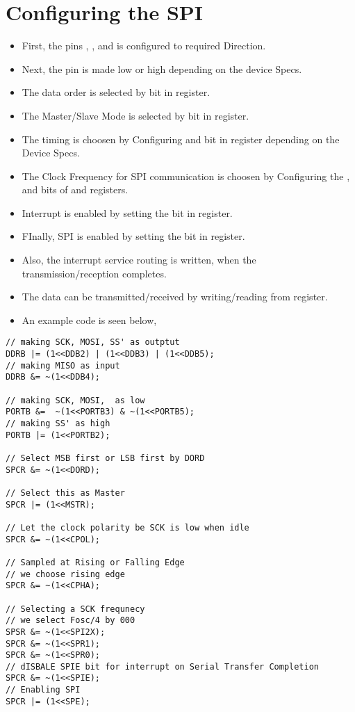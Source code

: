 \section{Configuring the SPI}
\begin{itemize}
    \item First, the pins , ,  and  is configured to required Direction.
    \item Next, the   pin is made low or high depending on the device Specs.
    \item The data order is selected by  bit in  register.
    \item The Master/Slave Mode is selected by  bit in  register.
    \item The timing is choosen by Configuring  and  bit in  register depending on the Device Specs.
    \item The Clock Frequency for SPI communication is choosen by Configuring the ,  and  bits of  and  registers.
    \item Interrupt is enabled by setting the  bit in  register.
    \item FInally, SPI is enabled by setting the  bit in  register.
    \item Also, the interrupt service routing is written, when the transmission/reception completes.
    \item The data can be transmitted/received by writing/reading from  register.
    \item An example code is seen below,
\end{itemize}

\begin{verbatim}
// making SCK, MOSI, SS' as outptut
DDRB |= (1<<DDB2) | (1<<DDB3) | (1<<DDB5);
// making MISO as input
DDRB &= ~(1<<DDB4);

// making SCK, MOSI,  as low
PORTB &=  ~(1<<PORTB3) & ~(1<<PORTB5);
// making SS' as high
PORTB |= (1<<PORTB2);

// Select MSB first or LSB first by DORD
SPCR &= ~(1<<DORD);
	
// Select this as Master
SPCR |= (1<<MSTR);

// Let the clock polarity be SCK is low when idle
SPCR &= ~(1<<CPOL);

// Sampled at Rising or Falling Edge
// we choose rising edge
SPCR &= ~(1<<CPHA);

// Selecting a SCK frequnecy
// we select Fosc/4 by 000
SPSR &= ~(1<<SPI2X);
SPCR &= ~(1<<SPR1);
SPCR &= ~(1<<SPR0);
// dISBALE SPIE bit for interrupt on Serial Transfer Completion
SPCR &= ~(1<<SPIE);
// Enabling SPI
SPCR |= (1<<SPE);
\end{verbatim}

